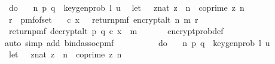 \begin{isabellebody}
\ \ do\ {\isacharbraceleft}{\kern0pt}\isanewline
\ \ {\isacharparenleft}{\kern0pt}n{\isacharcomma}{\kern0pt}\ {\isacharparenleft}{\kern0pt}p{\isacharcomma}{\kern0pt}\ q{\isacharparenright}{\kern0pt}{\isacharparenright}{\kern0pt}\ {\isasymleftarrow}\ key{\isacharunderscore}{\kern0pt}gen{\isacharunderscore}{\kern0pt}prob\ l\ u{\isacharsemicolon}{\kern0pt}\isanewline
\ \ let\ {\isasymZ}\ {\isacharequal}{\kern0pt}\ {\isacharbraceleft}{\kern0pt}{\isacharparenleft}{\kern0pt}z{\isacharcolon}{\kern0pt}{\isacharcolon}{\kern0pt}nat{\isacharparenright}{\kern0pt}{\isachardot}{\kern0pt}\ z\ {\isacharless}{\kern0pt}\ n\ {\isasymand}\ coprime\ z\ n{\isacharbraceright}{\kern0pt}{\isacharsemicolon}{\kern0pt}\isanewline
\ \ r\ {\isasymleftarrow}\ pmf{\isacharunderscore}{\kern0pt}of{\isacharunderscore}{\kern0pt}set\ {\isasymZ}{\isacharsemicolon}{\kern0pt}\isanewline
\ \ {\isacharparenleft}{\kern0pt}c{\isacharcomma}{\kern0pt}\ x{\isacharparenright}{\kern0pt}\ {\isasymleftarrow}\ \ return{\isacharunderscore}{\kern0pt}pmf\ {\isacharparenleft}{\kern0pt}encrypt{\isacharunderscore}{\kern0pt}alt\ n\ m\ r{\isacharparenright}{\kern0pt}{\isacharsemicolon}{\kern0pt}\isanewline
\ \ return{\isacharunderscore}{\kern0pt}pmf\ {\isacharparenleft}{\kern0pt}decrypt{\isacharunderscore}{\kern0pt}alt\ p\ q\ {\isacharparenleft}{\kern0pt}c{\isacharcomma}{\kern0pt}\ x{\isacharparenright}{\kern0pt}\ {\isacharequal}{\kern0pt}\ m{\isacharparenright}{\kern0pt}{\isacharbraceright}{\kern0pt}{\isachardoublequoteclose}\ \isanewline
\ \ \ \ \isamarkupfalse%
\ encrypt{\isacharunderscore}{\kern0pt}prob{\isacharunderscore}{\kern0pt}def\ \isanewline
\ \ \ \ \isamarkupfalse%
\ {\isacharparenleft}{\kern0pt}auto\ simp\ add{\isacharcolon}{\kern0pt}\ bind{\isacharunderscore}{\kern0pt}assoc{\isacharunderscore}{\kern0pt}pmf{\isacharparenright}{\kern0pt}\isanewline
\isanewline
\ \ \isamarkupfalse%
\ \isamarkupfalse%
\ {\isachardoublequoteopen}{\isachardot}{\kern0pt}{\isachardot}{\kern0pt}{\isachardot}{\kern0pt}\ {\isacharequal}{\kern0pt}\isanewline
\ \ \ do\ {\isacharbraceleft}{\kern0pt}\isanewline
\ \ {\isacharparenleft}{\kern0pt}n{\isacharcomma}{\kern0pt}\ {\isacharparenleft}{\kern0pt}p{\isacharcomma}{\kern0pt}\ q{\isacharparenright}{\kern0pt}{\isacharparenright}{\kern0pt}\ {\isasymleftarrow}\ key{\isacharunderscore}{\kern0pt}gen{\isacharunderscore}{\kern0pt}prob\ l\ u{\isacharsemicolon}{\kern0pt}\isanewline
\ \ let\ {\isasymZ}\ {\isacharequal}{\kern0pt}\ {\isacharbraceleft}{\kern0pt}{\isacharparenleft}{\kern0pt}z{\isacharcolon}{\kern0pt}{\isacharcolon}{\kern0pt}nat{\isacharparenright}{\kern0pt}{\isachardot}{\kern0pt}\ z\ {\isacharless}{\kern0pt}\ n\ {\isasymand}\ coprime\ z\ n{\isacharbraceright}{\kern0pt}{\isacharsemicolon}{\kern0pt}\isanewline

\end{isabellebody}
